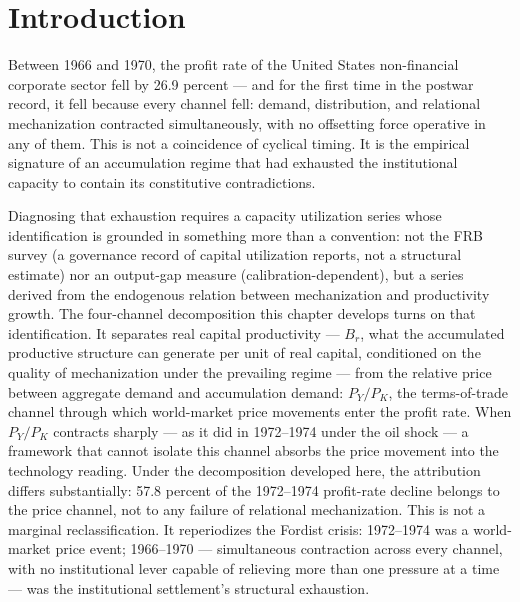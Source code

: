 \documentclass[11pt,a4paper]{article}
\title{}
\author{Diego Polanco}
\date{\today}
\begin{document}
	
\section{Introduction}
\label{ch2:sec:introduction}

Between 1966 and 1970, the profit rate of the United States
non-financial corporate sector fell by 26.9 percent --- and for the
first time in the postwar record, it fell because every channel fell:
demand, distribution, and relational mechanization contracted
simultaneously, with no offsetting force operative in any of them.
This is not a coincidence of cyclical timing. It is the empirical
signature of an accumulation regime that had exhausted the
institutional capacity to contain its constitutive contradictions.

Diagnosing that exhaustion requires a capacity utilization series
whose identification is grounded in something more than a convention:
not the FRB survey (a governance record of capital utilization
reports, not a structural estimate) nor an output-gap measure
(calibration-dependent), but a series derived from the endogenous
relation between mechanization and productivity growth. The
four-channel decomposition this chapter develops turns on that
identification. It separates real capital productivity --- $B_r$,
what the accumulated productive structure can generate per unit of
real capital, conditioned on the quality of mechanization under the
prevailing regime --- from the relative price between aggregate demand
and accumulation demand: $P_Y/P_K$, the terms-of-trade channel
through which world-market price movements enter the profit rate.
When $P_Y/P_K$ contracts sharply --- as it did in 1972--1974 under
the oil shock --- a framework that cannot isolate this channel absorbs
the price movement into the technology reading. Under the
decomposition developed here, the attribution differs substantially:
57.8 percent of the 1972--1974 profit-rate decline belongs to the
price channel, not to any failure of relational mechanization. This
is not a marginal reclassification. It reperiodizes the Fordist
crisis: 1972--1974 was a world-market price event; 1966--1970 ---
simultaneous contraction across every channel, with no institutional
lever capable of relieving more than one pressure at a time --- was
the institutional settlement's structural exhaustion.
\end{document}
